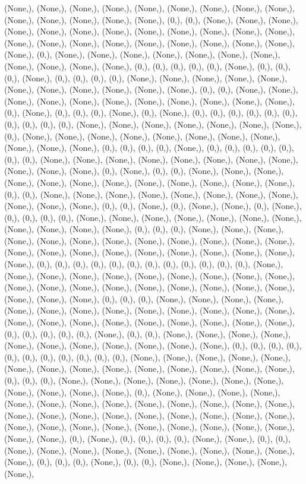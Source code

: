 \documentclass{article}
\begin{document}
(None,), (None,), (None,), (None,), (None,), (None,), (None,), (None,), (None,), (None,), (None,), (None,), (None,), (None,), (0,), (0,), (None,), (None,), (None,), (None,), (None,), (None,), (None,), (None,), (None,), (None,), (None,), (None,), (None,), (None,), (None,), (None,), (None,), (None,), (None,), (None,), (None,), (None,), (0,), (None,), (None,), (None,), (None,), (None,), (None,), (None,), (None,), (None,), (None,), (None,), (0,), (0,), (0,), (0,), (0,), (None,), (0,), (0,), (0,), (None,), (0,), (0,), (0,), (0,), (None,), (None,), (None,), (None,), (None,), (None,), (None,), (None,), (None,), (None,), (None,), (0,), (0,), (None,), (None,), (None,), (None,), (None,), (None,), (None,), (None,), (None,), (None,), (None,), (0,), (None,), (0,), (0,), (0,), (None,), (0,), (None,), (0,), (0,), (0,), (0,), (0,), (0,), (0,), (0,), (0,), (0,), (None,), (None,), (None,), (None,), (None,), (None,), (None,), (0,), (None,), (None,), (None,), (None,), (None,), (None,), (None,), (None,), (None,), (None,), (None,), (0,), (0,), (0,), (0,), (None,), (0,), (0,), (0,), (0,), (0,), (0,), (0,), (None,), (None,), (None,), (None,), (None,), (None,), (None,), (None,), (None,), (None,), (None,), (0,), (None,), (0,), (0,), (None,), (None,), (None,), (None,), (None,), (None,), (None,), (None,), (None,), (None,), (None,), (None,), (0,), (0,), (None,), (None,), (None,), (None,), (None,), (None,), (None,), (None,), (None,), (None,), (None,), (0,), (0,), (None,), (0,), (None,), (None,), (0,), (None,), (0,), (0,), (0,), (0,), (None,), (None,), (None,), (None,), (None,), (None,), (None,), (None,), (None,), (None,), (None,), (0,), (0,), (0,), (None,), (None,), (None,), (None,), (None,), (None,), (None,), (None,), (None,), (None,), (None,), (None,), (None,), (None,), (None,), (None,), (None,), (None,), (None,), (None,), (None,), (None,), (0,), (0,), (0,), (0,), (0,), (0,), (0,), (0,), (0,), (0,), (0,), (0,), (None,), (None,), (None,), (None,), (None,), (None,), (None,), (None,), (None,), (None,), (None,), (None,), (None,), (None,), (None,), (None,), (None,), (None,), (None,), (None,), (None,), (None,), (0,), (0,), (0,), (None,), (None,), (None,), (None,), (None,), (None,), (None,), (None,), (None,), (None,), (None,), (None,), (None,), (None,), (None,), (None,), (None,), (None,), (None,), (None,), (None,), (None,), (0,), (0,), (0,), (0,), (0,), (None,), (0,), (0,), (None,), (None,), (None,), (None,), (None,), (None,), (None,), (None,), (None,), (None,), (None,), (0,), (0,), (0,), (0,), (0,), (0,), (0,), (0,), (0,), (0,), (0,), (None,), (None,), (None,), (None,), (None,), (None,), (None,), (None,), (None,), (None,), (None,), (None,), (None,), (None,), (0,), (0,), (0,), (None,), (None,), (None,), (None,), (None,), (None,), (None,), (None,), (None,), (None,), (None,), (0,), (None,), (None,), (None,), (None,), (None,), (None,), (None,), (None,), (None,), (None,), (None,), (None,), (None,), (None,), (None,), (None,), (None,), (None,), (None,), (None,), (None,), (None,), (None,), (None,), (None,), (None,), (None,), (None,), (None,), (None,), (None,), (None,), (None,), (0,), (None,), (0,), (0,), (0,), (0,), (None,), (None,), (0,), (0,), (None,), (None,), (None,), (None,), (None,), (None,), (None,), (None,), (None,), (None,), (0,), (0,), (0,), (None,), (0,), (0,), (None,), (None,), (None,), (None,), (None,), 
\end{document}

